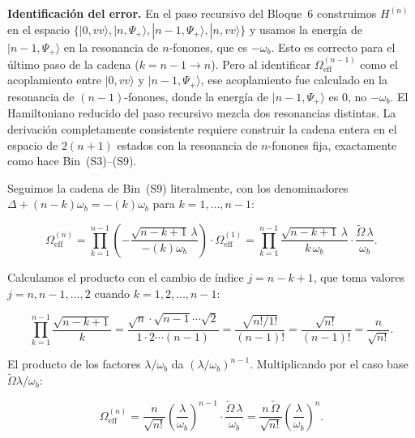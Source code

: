 \documentclass[12pt]{article}
\begin{document}
	\medskip
	\noindent
	\textbf{Identificaci\'on del error.} En el paso recursivo del Bloque~6
	construimos $H^{(n)}$ en el espacio
	$\{|0,vv\rangle, |n,\Psi_+\rangle, |n-1,\Psi_+\rangle, |n,vv\rangle\}$
	y usamos la energ\'ia de $|n-1,\Psi_+\rangle$ en la resonancia de $n$-fonones,
	que es $-\omega_b$. Esto es correcto para el \'ultimo paso de la cadena
	($k = n-1 \to n$). Pero al identificar $\Omega_\mathrm{eff}^{(n-1)}$ como el
	acoplamiento entre $|0,vv\rangle$ y $|n-1,\Psi_+\rangle$, ese acoplamiento
	fue calculado en la resonancia de $(n-1)$-fonones, donde la energ\'ia de
	$|n-1,\Psi_+\rangle$ es $0$, no $-\omega_b$. El Hamiltoniano reducido del
	paso recursivo mezcla dos resonancias distintas. La derivaci\'on completamente
	consistente requiere construir la cadena entera en el espacio de $2(n+1)$
	estados con la resonancia de $n$-fonones fija, exactamente como hace
	Bin~(S3)--(S9).
	
	\medskip
	\noindent
	Seguimos la cadena de Bin~(S9) literalmente, con los denominadores
	$\Delta + (n-k)\omega_b = -(k)\omega_b$ para $k = 1, \ldots, n-1$:
	
	\begin{equation}
		\Omega_\mathrm{eff}^{(n)}
		= \prod_{k=1}^{n-1}\left(-\frac{\sqrt{n-k+1}\,\lambda}
		{-(k)\omega_b}\right)\cdot\Omega_\mathrm{eff}^{(1)}
		= \prod_{k=1}^{n-1}\frac{\sqrt{n-k+1}\,\lambda}{k\,\omega_b}
		\cdot\frac{\widetilde\Omega\,\lambda}{\omega_b}.
		\label{eq:cadena_correcta}
	\end{equation}
	
	\noindent
	Calculamos el producto con el cambio de \'indice $j = n-k+1$, que toma
	valores $j = n, n-1, \ldots, 2$ cuando $k = 1, 2, \ldots, n-1$:
	
	\begin{equation}
		\prod_{k=1}^{n-1}\frac{\sqrt{n-k+1}}{k}
		= \frac{\sqrt{n}\cdot\sqrt{n-1}\cdots\sqrt{2}}{1\cdot 2\cdots(n-1)}
		= \frac{\sqrt{n!/1!}}{(n-1)!}
		= \frac{\sqrt{n!}}{(n-1)!}
		= \frac{n}{\sqrt{n!}}.
	\end{equation}
	
	\noindent
	El producto de los factores $\lambda/\omega_b$ da $(\lambda/\omega_b)^{n-1}$.
	Multiplicando por el caso base $\widetilde\Omega\lambda/\omega_b$:
	
	\begin{equation}
		\Omega_\mathrm{eff}^{(n)}
		= \frac{n}{\sqrt{n!}}\left(\frac{\lambda}{\omega_b}\right)^{n-1}
		\cdot\frac{\widetilde\Omega\,\lambda}{\omega_b}
		= \frac{n\,\widetilde\Omega}{\sqrt{n!}}\left(\frac{\lambda}{\omega_b}\right)^n.
	\end{equation}
	
\end{document}
